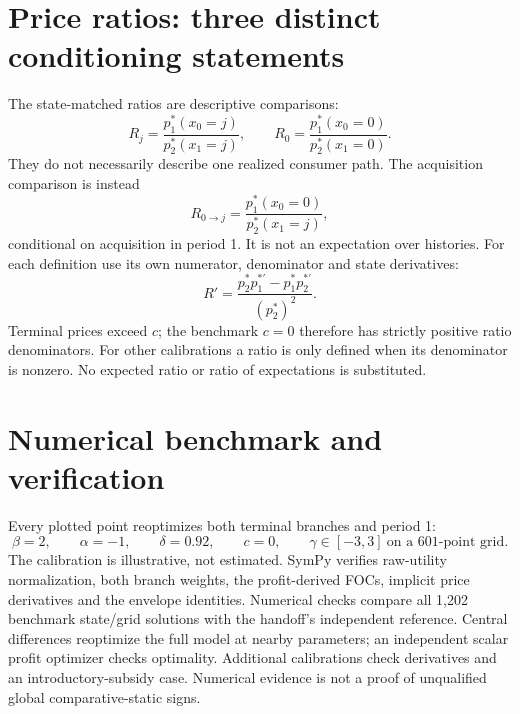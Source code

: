 \documentclass[11pt]{article}
\begin{document}
\section{Price ratios: three distinct conditioning statements}
The state-matched ratios are descriptive comparisons:
\[
 R_j=\frac{p_1^*(x_0=j)}{p_2^*(x_1=j)},\qquad
 R_0=\frac{p_1^*(x_0=0)}{p_2^*(x_1=0)}.
\]
They do not necessarily describe one realized consumer path. The acquisition
comparison is instead
\[
 R_{0\to j}=\frac{p_1^*(x_0=0)}{p_2^*(x_1=j)},
\]
conditional on acquisition in period 1. It is not an expectation over histories.
For each definition use its own numerator, denominator and state derivatives:
\[
 \boxed{R'=\frac{p_2^*p_1^{*\prime}-p_1^*p_2^{*\prime}}{(p_2^*)^2}}.
\]
Terminal prices exceed $c$; the benchmark $c=0$ therefore has strictly positive
ratio denominators. For other calibrations a ratio is only defined when its
denominator is nonzero. No expected ratio or ratio of expectations is substituted.

\section{Numerical benchmark and verification}
Every plotted point reoptimizes both terminal branches and period 1:
\[
 \beta=2,\qquad\alpha=-1,\qquad\delta=0.92,\qquad c=0,\qquad
 \gamma\in[-3,3]\ \text{on a 601-point grid}.
\]
The calibration is illustrative, not estimated. SymPy verifies raw-utility
normalization, both branch weights, the profit-derived FOCs, implicit price
derivatives and the envelope identities. Numerical checks compare all 1,202
benchmark state/grid solutions with the handoff's independent reference.
Central differences reoptimize the full model at nearby parameters; an
independent scalar profit optimizer checks optimality. Additional calibrations
check derivatives and an introductory-subsidy case. Numerical evidence is not
a proof of unqualified global comparative-static signs.
\end{document}
